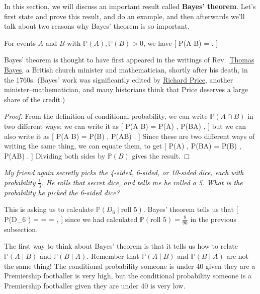 \documentclass[
  letterpaper,
]{report}
\theoremstyle{definition}
\theoremstyle{definition}
\theoremstyle{remark}
\begin{document}
In this section, we will discuss an important result called
\textbf{Bayes' theorem}. Let's first state and prove this result, and do
an example, and then afterwards we'll talk about two reasons why Bayes'
theorem is so important.

\leavevmode{}%
For events \(A\) and \(B\) with \(\mathbb P(A), \mathbb P(B) > 0\), we
have {[} \mathbb P(A \mid B) =
 . {]}

Bayes' theorem is thought to have first appeared in the writings of
Rev.~\href{https://mathshistory.st-andrews.ac.uk/Biographies/Bayes/}{Thomas
Bayes}, a British church minister and mathematician, shortly after his
death, in the 1760s. (Bayes' work was significantly edited by
\href{https://mathshistory.st-andrews.ac.uk/Biographies/Price/}{Richard
Price}, another minister--mathematician, and many historians think that
Price deserves a large share of the credit.)

\begin{proof}

From the definition of conditional probability, we can write
\(\mathbb P(A \cap B)\) in two different ways: we can write it as {[}
\mathbb P(A \cap B) = \mathbb P(A) , \mathbb P(B\mid A) , {]} but we can
also write it as {[} \mathbb P(A \cap B) = \mathbb P(B) ,
\mathbb P(A\mid B) . {]} Since these are two different ways of writing
the same thing, we can equate them, to get {[} \mathbb P(A) ,
\mathbb P(B\mid A) = \mathbb P(B) , \mathbb P(A\mid B) . {]} Dividing
both sides by \(\mathbb P(B)\) gives the result.

\end{proof}

\emph{My friend again secretly picks the 4-sided, 6-sided, or 10-sided
dice, each with probability \(\frac13\). He rolls that secret dice, and
tells me he rolled a 5. What is the probability he picked the 6-sided
dice?}

This is asking us to calculate \(\mathbb P(D_6 \mid \text{roll 5})\).
Bayes' theorem tells us that {[} \mathbb P(D\_6 \mid {}) =
=  =  , {]} since
we had calculated \(\mathbb P(\text{roll 5}) = \frac{8}{90}\) in the
previous subsection.

The first way to think about Bayes' theorem is that it tells us how to
relate \(\mathbb P(A \mid B)\) and \(\mathbb P(B \mid A)\). Remember
that \(\mathbb P(A \mid B)\) and \(\mathbb P(B \mid A)\) are not the
same thing! The conditional probability someone is under 40 given they
are a Premiership footballer is very high, but the conditional
probability someone is a Premiership footballer given they are under 40
is very low.
\end{document}
